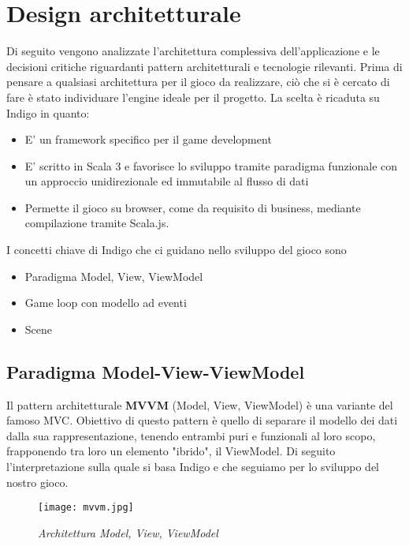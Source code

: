 \section{Design architetturale}

Di seguito vengono analizzate l'architettura complessiva dell'applicazione e le decisioni critiche riguardanti pattern architetturali e tecnologie rilevanti.
Prima di pensare a qualsiasi architettura per il gioco da realizzare, ciò che si è cercato di fare è stato individuare l'engine ideale per il progetto. 
La scelta è ricaduta su Indigo in quanto: 
\begin{itemize}
    \item E' un framework specifico per il game development
    \item E' scritto in Scala 3 e favorisce lo sviluppo tramite paradigma funzionale con un approccio unidirezionale ed immutabile al flusso di dati
    \item Permette il gioco su browser, come da requisito di business, mediante compilazione tramite Scala.js.
\end{itemize}
I concetti chiave di Indigo che ci guidano nello sviluppo del gioco sono 
\begin{itemize}
    \item Paradigma Model, View, ViewModel
    \item Game loop con modello ad eventi
    \item Scene
\end{itemize}

\subsection{Paradigma Model-View-ViewModel}
Il pattern architetturale \textbf{MVVM} (Model, View, ViewModel) è una variante del famoso MVC. 
Obiettivo di questo pattern è quello di separare il modello dei dati dalla sua rappresentazione, tenendo entrambi puri e funzionali al loro scopo, frapponendo tra loro un elemento "ibrido", il ViewModel.
Di seguito l'interpretazione sulla quale si basa Indigo e che seguiamo per lo sviluppo del nostro gioco.


\begin{figure}[!hbt]
    \centering
    \texttt{[image: mvvm.jpg]}
    \caption{\textit{Architettura Model, View, ViewModel}} 
\end{figure}

